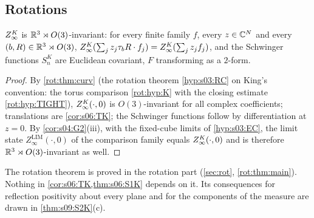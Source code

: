 \subsection{Rotations}

\begin{theorem}[rotations]\label{thm:s06:O3}
$Z^{K}_{\infty}$ is $\mathbb R^3\rtimes O(3)$-invariant: for every finite family $f$, every $z\in\mathbb C^N$ and every $(b,R)\in\mathbb R^3\rtimes O(3)$, $Z^{K}_{\infty}(\sum_jz_j\tau_bR\cdot f_j)=Z^{K}_{\infty}(\sum_jz_jf_j)$, and the Schwinger functions $S^K_n$ are Euclidean covariant, $F$ transforming as a $2$-form.
\end{theorem}

\begin{proof}
By \cref{rot:thm:curv} (the rotation theorem \cref{hyp:s03:RC} on King's convention: the torus comparison \cref{rot:hyp:K} with the closing estimate \cref{rot:hyp:TIGHT}), $Z^{K}_{\infty}(\cdot,0)$ is $O(3)$-invariant for all complex coefficients; translations are \cref{cor:s06:TK}; the Schwinger functions follow by differentiation at $z=0$. By \cref{cor:s04:G2}(iii), with the fixed-cube limits of \cref{hyp:s03:EC}, the limit state $Z^{\mathrm{LIM}}_\infty(\cdot,0)$ of the comparison family equals $Z^{K}_{\infty}(\cdot,0)$ and is therefore $\mathbb R^3\rtimes O(3)$-invariant as well.
\end{proof}

The rotation theorem is proved in the rotation part (\cref{sec:rot}, \cref{rot:thm:main}). Nothing in \cref{cor:s06:TK,thm:s06:S1K} depends on it. Its consequences for reflection positivity about every plane and for the components of the measure are drawn in \cref{thm:s09:S2K}(c).
